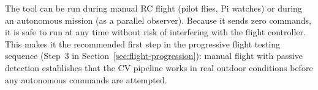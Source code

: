 \noindent The tool can be run during manual RC flight (pilot flies, Pi watches) or during an autonomous mission (as a parallel observer).  Because it sends zero commands, it is safe to run at any time without risk of interfering with the flight controller.  This makes it the recommended first step in the progressive flight testing sequence (Step~3 in Section~\ref{sec:flight-progression}): manual flight with passive detection establishes that the CV pipeline works in real outdoor conditions before any autonomous commands are attempted.
